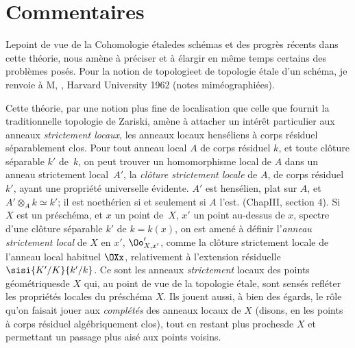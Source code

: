 \section[Commentaires]{Commentaires\protect\sfootnotemark} \label{XIII.6}

Le\pageoriginale point de vue de la \og Cohomologie \'etale\fg des sch\'emas et des progr\`es r\'ecents dans cette th\'eorie, nous am\`ene \`a pr\'eciser et \`a \'elargir en m\^eme temps certains des probl\`emes pos\'es. Pour la notion de \og topologie\fg et de \og topologie \'etale d'un sch\'ema\fg, je renvoie \`a M\ptbl{}, , Harvard University 1962 (notes mim\'eographi\'ees).

Cette th\'eorie, par une notion plus fine de localisation que celle que fournit la traditionnelle \og topologie de Zariski\fg, am\`ene \`a attacher un int\'er\^et particulier aux anneaux \emph{strictement locaux}\label{pXIII.6}, \ie les anneaux locaux hens\'eliens \`a corps r\'esiduel s\'eparablement clos. Pour tout anneau local $A$ de corps r\'esiduel $k$, et toute cl\^{o}ture s\'eparable $k'$ de~$k$, on peut trouver un homomorphisme local de $A$ dans un anneau strictement local~$A'$, la \emph{cl\^{o}ture strictement locale} de $A$, de corps r\'esiduel $k'$, ayant une propri\'et\'e universelle \'evidente. $A'$ est hens\'elien, plat sur $A$, et $A'\otimes_A k\simeq k'$; il est noeth\'erien si et seulement si $A$ l'est. (\Cf \loccit Chap\ptbl III, section 4). Si $X$ est un pr\'esch\'ema, et $x$ un point de~$X$, $x'$ un point au-dessus de $x$, spectre d'une cl\^{o}ture s\'eparable $k'$ de $k=k(x)$, on est amen\'e \`a d\'efinir l'\emph{anneau strictement local} de $X$ en $x'$, $\Oo'_{X, x'}$, comme la cl\^{o}ture strictement locale de l'anneau local habituel $\OXx$, relativement \`a l'extension r\'esiduelle $\sisi{K'/K}{k'/k}$. Ce sont les anneaux \emph{strictement} locaux des points \og g\'eom\'etriques\fg de $X$ qui, au point de vue de la topologie \'etale, sont sens\'es refl\'eter les propri\'et\'es locales du pr\'esch\'ema $X$. Ils jouent aussi, \`a bien des \'egards, le r\^{o}le qu'on faisait jouer aux \emph{compl\'et\'es} des anneaux locaux de $X$ (disons, en les points \`a corps r\'esiduel alg\'ebriquement clos), tout en restant \og plus proches\fg de $X$ et permettant un passage plus ais\'e aux \og points voisins\fg.

